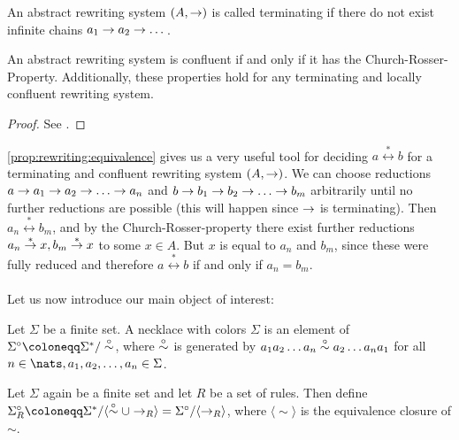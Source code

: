 \begin{definition}[Termination] An abstract rewriting system $(A, \rightarrow)$ is called terminating if there do not exist infinite chains $a_1 \rightarrow a_2 \rightarrow \dots$.
\end{definition}

\begin{proposition} \label{prop:rewriting:equivalence} An abstract rewriting system is confluent if and only if it has the {\sc Church-Rosser}-Property. Additionally, these properties hold for any terminating and locally confluent rewriting system.
\begin{proof} See \cite{baader1999term}.
\end{proof}
\end{proposition}

\autoref{prop:rewriting:equivalence} gives us a very useful tool for deciding $a \stackrel{\ast}{\leftrightarrow} b$ for a terminating and confluent rewriting system $(A, \rightarrow)$. We can choose reductions $a \rewrite a_1 \rewrite a_2 \rewrite \dots \rewrite a_n$ and $b \rewrite b_1 \rewrite b_2 \rewrite \dots \rewrite b_m$ arbitrarily until no further reductions are possible (this will happen since $\rightarrow$ is terminating). Then $a_n \stackrel{\ast}{\leftrightarrow} b_m$, and by the {\sc Church-Rosser}-property there exist further reductions $a_n \stackrel{\ast}{\rightarrow} x, b_m \stackrel{\ast}{\rightarrow} x$ to some $x \in A$. But $x$ is equal to $a_n$ and $b_m$, since these were fully reduced and therefore $a \stackrel{\ast}{\leftrightarrow} b$ if and only if $a_n = b_m$.
\\\\
Let us now introduce our main object of interest:

\begin{definition}[Necklace] \label{def:necklace} Let $\Sigma$ be a finite set. A necklace with colors $\Sigma$ is an element of $\Sigma^\circ \coloneqq \Sigma^\ast / \cycsim$, where $\stackrel{\circ}{\sim}$ is generated by $a_1 a_2 \dots a_n \stackrel{\circ}{\sim} a_2 \dots a_n a_1$ for all $n \in \nats, a_1, a_2, \dots, a_n \in \Sigma$.
\end{definition}

\begin{definition} Let $\Sigma$ again be a finite set and let $R$ be a set of rules. Then define $\Sigma_R^\circ \coloneqq \Sigma^\ast / \langle \cycsim \cup \rewrite_{R} \rangle = \Sigma^\circ /\langle \rewrite_R \rangle$, where $\langle \sim \rangle$ is the equivalence closure of $\sim$.
\end{definition}

